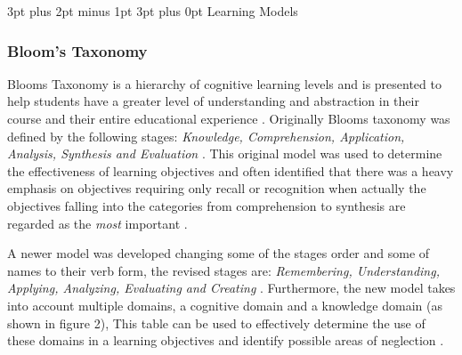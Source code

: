 \documentclass[12pt,a4paper]{article}
\makeatletter
\renewcommand\subsection{\@startsection {subsection}{1}{2mm} %
                               {3pt plus 2pt minus 1pt} %
                               {3pt plus 0pt} %
                               {\normalfont\bfseries}}
\makeatother
\begin{document}
\subsection{Learning Models}
\subsubsection{Bloom's Taxonomy} 
Blooms Taxonomy is a hierarchy of cognitive learning levels and is presented to help students have a greater level of understanding and abstraction in their course and their entire educational experience \cite{bloom1965bloom}. Originally Blooms taxonomy was defined by the following stages: \emph{Knowledge, Comprehension, Application, Analysis, Synthesis and Evaluation} \cite{anderson1994bloom}. This original model was used to determine the effectiveness of learning objectives and often identified that there was a heavy emphasis on objectives requiring only recall or recognition when actually the objectives falling into the categories from comprehension to synthesis are regarded as the \emph{most} important \cite{krathwohl2002revision}.  


A newer model was developed changing some of the stages order and some of names to their verb form, the revised stages are: \emph{Remembering, Understanding, Applying, Analyzing, Evaluating and Creating} \cite{forehand2010bloom}. Furthermore, the new model takes into account multiple domains, a cognitive domain and a knowledge domain (as shown in figure 2),  This table can be used to effectively determine the use of these domains in a learning objectives and identify possible areas of neglection \cite{krathwohl2002revision2}. 
\end{document}
